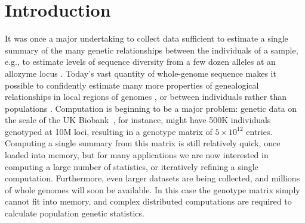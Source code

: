 \documentclass{article}
\begin{document}
%
%
%
%
%
%
%
%
%



\section*{Introduction}

It was once a major undertaking to collect data sufficient to estimate a single summary
of the many genetic relationships between the individuals of a sample,
e.g., to estimate levels of sequence diversity from a few dozen alleles at an allozyme locus
\citep{Kreitman1983-xr}.
Today's vast quantity of whole-genome sequence
makes it possible to confidently estimate many more properties of genealogical relationships
in local regions of genomes \citep[e.g,][]{booker2018understanding,haenel2018metaanalysis,stankowski2019widespread},
or between individuals rather than populations \citep[e.g.,][]{browning2010highresolution,speed2014relatedness,aguillon2017deconstructing}.
Computation is beginning to be a major problem:
genetic data on the scale of the UK Biobank~\citep{bycroft2018genome},
for instance, might have 500K individuals genotyped at 10M loci,
resulting in a genotype matrix of $5 \times 10^{12}$ entries.
Computing a single summary from this matrix is still relatively quick,
once loaded into memory,
but for many applications we are now interested in computing a large number of statistics,
or iteratively refining a single computation.
Furthermore, even larger datasets are being collected,
and millions of whole genomes will soon be available. In this case the
genotype matrix simply cannot fit into memory, and complex distributed
computations are required to calculate population genetic statistics.
\end{document}
